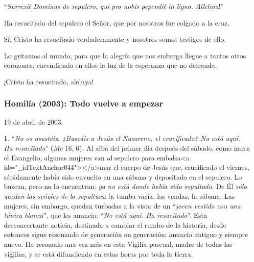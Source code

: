 			\begin{body}“\textit{Surrexit Dominus de sepulcro, qui pro nobis pependit in ligno. Alleluia}!”\end{body}
			
			\begin{body}Ha resucitado del sepulcro el Señor, que por nosotros fue colgado a la cruz.\end{body}
			
			\begin{body}Sí, Cristo ha resucitado verdaderamente y nosotros somos testigos de ello.\end{body}
			
			\begin{body}Lo gritamos al mundo, para que la alegría que nos embarga llegue a tantos otros corazones, encendiendo en ellos la luz de la esperanza que no defrauda.\end{body}
			
			\begin{body}¡Cristo ha resucitado, aleluya!\end{body}
			
			\subsubsection{Homilía (2003): Todo vuelve a empezar}
			
			\begin{referencia}19 de abril de 2003.\end{referencia}
			
			\begin{body}1. “\textit{No os asustéis. ¿Buscáis a Jesús el Nazareno, el crucificado? No está aquí. Ha resucitado}” (\textit{Mc} 16, 6). Al alba del primer día después del sábado, como narra el Evangelio, algunas mujeres van al sepulcro para embalsa<a id="_idTextAnchor044"></a>mar el cuerpo de Jesús que, crucificado el viernes, rápidamente había sido envuelto en una sábana y depositado en el sepulcro. Lo buscan, pero no lo encuentran: \textit{ya no está donde había sido sepultado}. De Él \textit{sólo quedan las señales de la sepultura}: la tumba vacía, las vendas, la sábana. Las mujeres, sin embargo, quedan turbadas a la vista de un “\textit{joven vestido con una túnica blanca}”, que les anuncia: “\textit{No está aquí. Ha resucitado}”. Esta desconcertante noticia, destinada a cambiar el rumbo de la historia, desde entonces sigue resonando de generación en generación: anuncio antiguo y siempre nuevo. Ha resonado una vez más en esta Vigilia pascual, madre de todas las vigilias, y se está difundiendo en estas horas por toda la tierra.\end{body}
			
